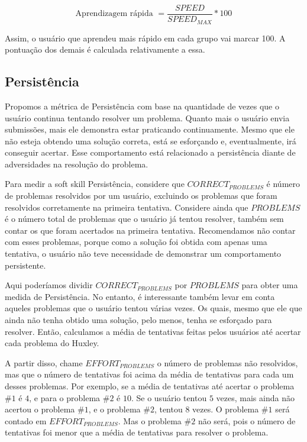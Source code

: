 \begin{equation} \label{m:aprendizagem}
\mbox{Aprendizagem rápida } = \frac{SPEED}{SPEED_{MAX}} * 100
\end{equation}

Assim, o usuário que aprendeu mais rápido em cada grupo vai marcar 100. A pontuação dos demais é calculada relativamente a essa.

\subsection{Persistência}

Propomos a métrica de Persistência com base na quantidade de vezes que o usuário continua tentando resolver um problema. Quanto mais o usuário envia submissões, mais ele demonstra estar praticando continuamente. Mesmo que ele não esteja obtendo uma solução correta, está se esforçando e, eventualmente, irá conseguir acertar.
Esse comportamento está relacionado a persistência diante de adversidades na resolução do problema.


Para medir a soft skill Persistência, considere que $CORRECT_{PROBLEMS}$ é número de problemas resolvidos por um usuário, excluindo os problemas que foram resolvidos corretamente na primeira tentativa. Considere ainda que $PROBLEMS$ é o número total de problemas que o usuário já tentou resolver, também sem contar os que foram acertados na primeira tentativa. Recomendamos não contar com esses problemas, porque como a solução foi obtida com apenas uma tentativa, o usuário não teve necessidade de demonstrar um comportamento persistente.

Aqui poderíamos dividir $CORRECT_{PROBLEMS}$ por $PROBLEMS$ para obter uma medida de Persistência.
No entanto, é interessante também levar em conta aqueles problemas que o usuário tentou várias vezes. Os quais, mesmo que ele que ainda não tenha obtido uma solução, pelo menos, tenha se esforçado para resolver. Então, calculamos a média de tentativas feitas pelos usuários até acertar cada problema do Huxley.

A partir disso, chame $EFFORT_{PROBLEMS}$ o número de problemas não resolvidos, mas que o número de tentativas foi acima da média de tentativas para cada um desses problemas. 
Por exemplo, se a média de tentativas até acertar o problema $\#1$ é $4$, e para o problema $\#2$ é $10$. Se o usuário tentou $5$ vezes, mais ainda não acertou o problema $\#1$, e o problema $\#2$, tentou $8$ vezes. O problema $\#1$ será contado em $EFFORT_{PROBLEMS}$. Mas o problema $\#2$ não será, pois o número de tentativas foi menor que a média de tentativas para resolver o problema.

